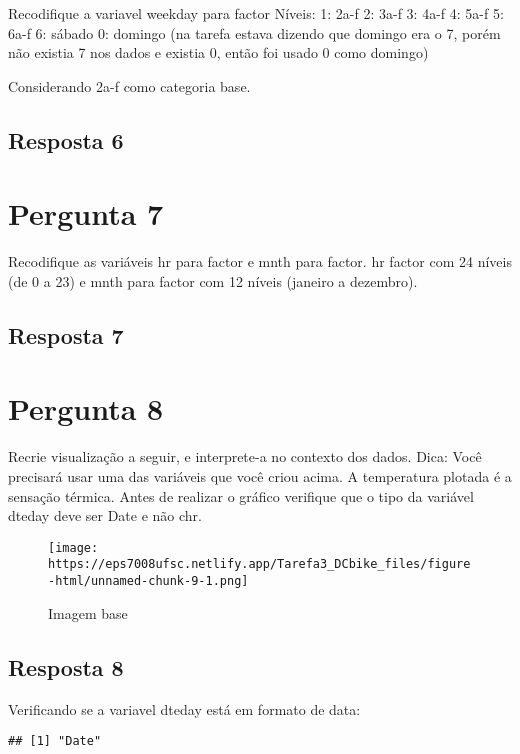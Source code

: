 \documentclass[
]{article}
\begin{document}
Recodifique a variavel weekday para factor Níveis: 1: 2a-f 2: 3a-f 3:
4a-f 4: 5a-f 5: 6a-f 6: sábado 0: domingo (na tarefa estava dizendo que
domingo era o 7, porém não existia 7 nos dados e existia 0, então foi
usado 0 como domingo)

Considerando 2a-f como categoria base.

\hypertarget{resposta-6}{%
\subsection{Resposta 6}\label{resposta-6}}

\hypertarget{pergunta-7}{%
\section{Pergunta 7}\label{pergunta-7}}

Recodifique as variáveis hr para factor e mnth para factor. hr factor
com 24 níveis (de 0 a 23) e mnth para factor com 12 níveis (janeiro a
dezembro).

\hypertarget{resposta-7}{%
\subsection{Resposta 7}\label{resposta-7}}

\hypertarget{pergunta-8}{%
\section{Pergunta 8}\label{pergunta-8}}

Recrie visualização a seguir, e interprete-a no contexto dos dados.
Dica: Você precisará usar uma das variáveis que você criou acima. A
temperatura plotada é a sensação térmica. Antes de realizar o gráfico
verifique que o tipo da variável dteday deve ser Date e não chr.

\begin{figure}
\centering
\texttt{[image: https://eps7008ufsc.netlify.app/Tarefa3\_DCbike\_files/figure-html/unnamed-chunk-9-1.png]}
\caption{Imagem base}
\end{figure}

\hypertarget{resposta-8}{%
\subsection{Resposta 8}\label{resposta-8}}

Verificando se a variavel dteday está em formato de data:

\begin{verbatim}
## [1] "Date"
\end{verbatim}
\end{document}
